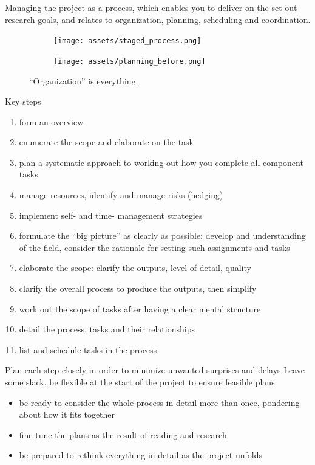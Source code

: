 \documentclass[10pt,a4paper,twocolumn]{article}
\begin{document}
Managing the project as a process, which enables you to deliver on the set out research
goals, and relates to organization, planning, scheduling and coordination.
\begin{figure}
  \centering
  \begin{subfigure}
    \centering
    \texttt{[image: assets/staged\_process.png]}
  \end{subfigure}%
  \begin{subfigure}
    \centering
    \texttt{[image: assets/planning\_before.png]}
  \end{subfigure}
  \caption{
    ``Organization'' is everything.
  }
  \label{fig:organization}
\end{figure}

Key steps
\begin{enumerate}
  \item form an overview
  \item enumerate the scope and elaborate on the task
  \item plan a systematic approach to working out how you complete all component tasks
  \item manage resources, identify and manage risks (hedging)
  \item implement self- and time- management strategies
  \item formulate the ``big picture'' as clearly as possible: develop and understanding
  of the field, consider the rationale for setting such assignments and tasks
  \item elaborate the scope: clarify the outputs, level of detail, quality
  \item clarify the overall process to produce the outputs, then simplify
  \item work out the scope of tasks after having a clear mental structure
  \item detail the process, tasks and their relationships
  \item list and schedule tasks in the process
\end{enumerate}

Plan each step closely in order to minimize unwanted surprises and delays Leave some
slack, be flexible at the start of the project to ensure feasible plans
\begin{itemize}
  \item be ready to consider the whole process in detail more than once, pondering about
  how it fits together
  \item fine-tune the plans as the result of reading and research
  \item be prepared to rethink everything in detail as the project unfolds
\end{itemize}
\end{document}
